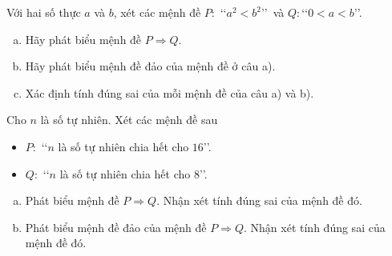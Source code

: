 \begin{bt}%
	Với hai số thực $a$ và $b$, xét các mệnh đề $P\colon$ \lq\lq $a^2<b^2$\rq\rq\, và $Q\colon$\lq\lq $0<a<b$\rq\rq.
	\begin{enumerate}[a)]
		\item Hãy phát biểu mệnh đề $P \Rightarrow Q$.
		\item Hãy phát biểu mệnh đề đảo của mệnh đề ở câu a).
		\item Xác định tính đúng sai của mỗi mệnh đề của câu a) và b).
	\end{enumerate}
\end{bt}

\begin{bt}%
	Cho $n$ là số tự nhiên. Xét các mệnh đề sau
	\begin{itemize}
		\item $P\colon$ \lq\lq $n$ là số tự nhiên chia hết cho $16$\rq\rq.
		\item $Q\colon$ \lq\lq $n$ là số tự nhiên chia hết cho $8$\rq\rq.
	\end{itemize}
	\begin{enumerate}[a)]
		\item Phát biểu mệnh đề $P\Rightarrow Q$. Nhận xét tính đúng sai của mệnh đề đó.
		\item Phát biểu mệnh đề đảo của mệnh đề $P \Rightarrow Q$. Nhận xét tính đúng sai của mệnh đề đó.
	\end{enumerate}
\end{bt}

